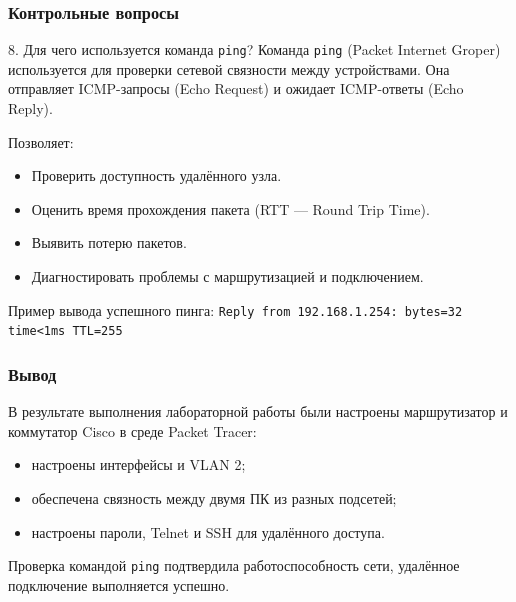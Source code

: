 \begin{frame}
\frametitle{Контрольные вопросы}
\begin{block}{8. Для чего используется команда \texttt{ping}?}
Команда \texttt{ping} (Packet Internet Groper) используется для проверки сетевой связности между устройствами. Она отправляет ICMP-запросы (Echo Request) и ожидает ICMP-ответы (Echo Reply).

Позволяет:
\begin{itemize}
    \item Проверить доступность удалённого узла.
    \item Оценить время прохождения пакета (RTT — Round Trip Time).
    \item Выявить потерю пакетов.
    \item Диагностировать проблемы с маршрутизацией и подключением.
\end{itemize}
Пример вывода успешного пинга: \texttt{Reply from 192.168.1.254: bytes=32 time<1ms TTL=255}
\end{block}
\end{frame}

\begin{frame}
\frametitle{Вывод}
В результате выполнения лабораторной работы были настроены маршрутизатор и коммутатор Cisco в среде Packet Tracer: 
\begin{itemize}
    \item настроены интерфейсы и VLAN 2;
    \item обеспечена связность между двумя ПК из разных подсетей;
    \item настроены пароли, Telnet и SSH для удалённого доступа.
\end{itemize}
Проверка командой \texttt{ping} подтвердила работоспособность сети, удалённое подключение выполняется успешно.
\end{frame}


